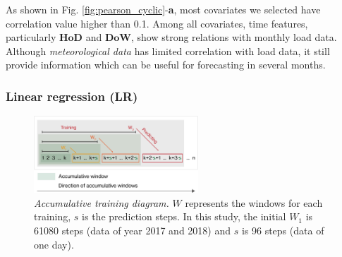As shown in Fig. \ref{fig:pearson_cyclic}-\textbf{a}, most covariates we selected have correlation value higher than 0.1. Among all covariates, time features, particularly $\mathbf{HoD}$ and $\mathbf{DoW}$, show strong relations with monthly load data. Although \emph{meteorological data} has limited correlation with load data, it still provide information which can be useful for forecasting in several months. 




\subsubsection{Linear regression (LR)}

\begin{figure}[!ht]
\centering
  \includegraphics[width=0.55\textwidth]{figures/Accumulative retraining.png}
  \caption{\textit{Accumulative training diagram.} $W$ represents the windows for each training, $s$ is the prediction steps. In this study, the initial $W_1$ is 61080 steps (data of year 2017 and 2018) and $s$ is 96 steps (data of one day). }
  \label{fig:Accumulative}
\end{figure}

